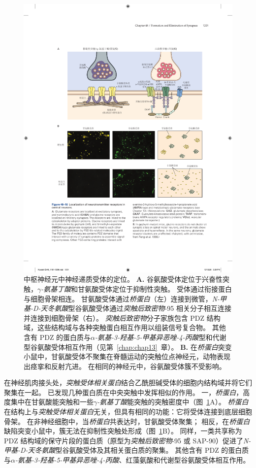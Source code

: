 \begin{figure}[htbp]
	\centering
	\includegraphics[width=1.0\linewidth]{chap48/fig_48_16}
	\caption{中枢神经元中神经递质受体的定位。
		\textbf{A.} 谷氨酸受体定位于兴奋性突触，\textit{$ \gamma $-氨基丁酸}和甘氨酸受体定位于抑制性突触。
		受体通过衔接蛋白与细胞骨架相连。
		甘氨酸受体通过\textit{桥蛋白}（左）连接到微管，\textit{N-甲基-D-天冬氨酸}型谷氨酸受体通过\textit{突触后致密物}-95 相关分子相互连接并连接到细胞骨架（右）。
		\textit{突触后致密物}分子家族包含 PDZ 结构域，这些结构域与各种突触蛋白相互作用以组装信号复合物。
		其他含有 PDZ 的蛋白质与\textit{$\alpha$-氨基-3-羟基-5-甲基异恶唑-4-丙酸}型和代谢型谷氨酸受体相互作用（见第~\ref{chap:chap13}~章）。
		\textbf{B.} 在\textit{桥蛋白}突变小鼠中，甘氨酸受体不聚集在脊髓运动的突触位点神经元，动物表现出痉挛和反射亢进。
		在相同的神经元中，谷氨酸受体簇不受影响\cite{feng1998dual}。}
	\label{fig:48_16}
\end{figure}


在神经肌肉接头处，\textit{突触受体相关蛋白}结合乙酰胆碱受体的细胞内结构域并将它们聚集在一起。
已发现几种蛋白质在中央突触中发挥相似的作用。
一，\textit{桥蛋白}，高度集中在甘氨酸能突触和一些\textit{$ \gamma $-氨基丁酸}能突触的突触密度中（图~\ref{fig:48_16}A）。
\textit{桥蛋白}在结构上与\textit{突触受体相关蛋白}无关，但具有相同的功能：它将受体连接到底层细胞骨架。
在非神经细胞中，当\textit{桥蛋白}共表达时，甘氨酸受体聚集；
相反，在\textit{桥蛋白}缺陷突变小鼠中，簇无法在抑制性突触处形成（图~\ref{fig:48_16}B）。
同样，一类共享称为 PDZ 结构域的保守片段的蛋白质（原型为\textit{突触后致密物}-95 或 SAP-90）促进了\textit{N-甲基-D-天冬氨酸}型谷氨酸受体及其相关蛋白质的聚集。
其他含有 PDZ 的蛋白质与\textit{$\alpha$-氨基-3-羟基-5-甲基异恶唑-4-丙酸}、红藻氨酸和代谢型谷氨酸受体相互作用。



